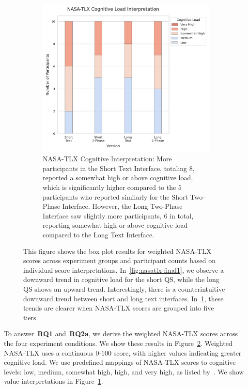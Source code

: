 \begin{figure}[ht]
\begin{subfigure}[b]{0.49\textwidth}
        \includegraphics[width=\textwidth]{content/image/results/nasatlx_cog_value_interpreted.pdf}
        \caption{NASA-TLX Cognitive Interpretation: More participants in the Short Text Interface, totaling $8$, reported a somewhat high or above cognitive load, which is significantly higher compared to the $5$ participants who reported similarly for the Short Two-Phase Interface. However, the Long Two-Phase Interface saw slightly more participants, $6$ in total, reporting somewhat high or above cognitive load compared to the Long Text Interface.\vspace{21pt}}
        \label{fig:nasatlx-final2}
    \end{subfigure}
    \caption{This figure shows the box plot results for weighted NASA-TLX scores across experiment groups and participant counts based on individual score interpretations. In~\ref{fig:nasatlx-final1}, we observe a downward trend in cognitive load for the short QS, while the long QS shows an upward trend. Interestingly, there is a counterintuitive downward trend between short and long text interfaces. In~\ref{fig:nasatlx-final2}, these trends are clearer when NASA-TLX scores are grouped into five tiers.}
    \label{fig:nasatlx-final}
\end{figure}

To answer~\textbf{RQ1} and~\textbf{RQ2a}, we derive the weighted NASA-TLX scores across the four experiment conditions. We show these results in Figure~\ref{fig:nasatlx-final}. Weighted NASA-TLX uses a continuous $0$-$100$ score, with higher values indicating greater cognitive load. We use predefined mappings of NASA-TLX scores to cognitive levels: low, medium, somewhat high, high, and very high, as listed by~\textcite{hart1988development}. We show value interpretations in Figure~\ref{fig:nasatlx-final2}. 

